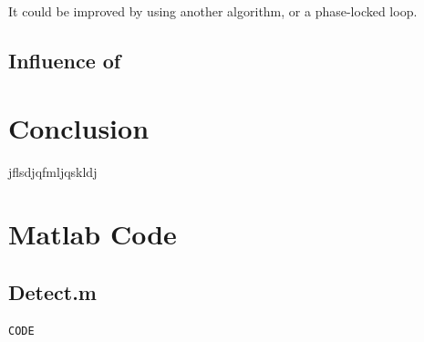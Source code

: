 \documentclass[a4paper,12pt]{article}
\renewcommand{\thesubsection}{\arabic{section}.\arabic{subsection}}
\begin{document}
It could be improved by using another algorithm, or a phase-locked loop.

\subsection{Influence of }


\clearpage
\section*{\centering Conclusion}
\vspace{1cm}
jflsdjqfmljqskldj

\appendix




\clearpage
\renewcommand{\thesubsection}{\arabic{subsection}}
\section*{Matlab Code}
\setcounter{subsection}{0}
\subsection{Detect.m}
\begin{verbatim}
CODE
\end{verbatim}






\end{document}
